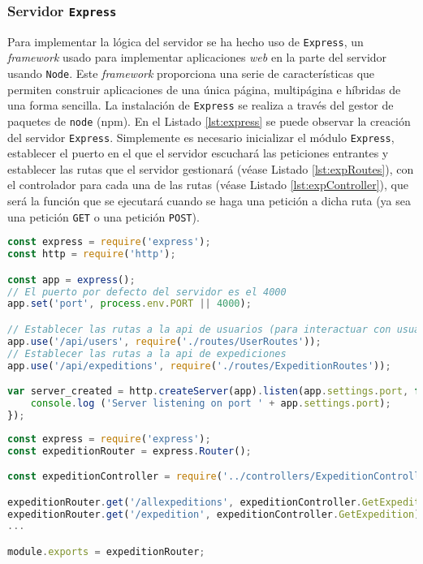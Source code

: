 \subsubsection{Servidor \texttt{Express}}

Para implementar la lógica del servidor se ha hecho uso de \texttt{Express}, un \textit{framework} usado para implementar aplicaciones \textit{web} en la parte del servidor usando \texttt{Node}. Este \textit{framework} proporciona una serie de características que permiten construir aplicaciones de una única página, multipágina e híbridas de una forma sencilla. La instalación de \texttt{Express} se realiza a través del gestor de paquetes de \texttt{node} (\ac{npm}). En el Listado \ref{lst:express} se puede observar la creación del servidor \texttt{Express}. Simplemente es necesario inicializar el módulo \texttt{Express}, establecer el puerto en el que el servidor escuchará las peticiones entrantes y establecer las rutas que el servidor gestionará (véase Listado \ref{lst:expRoutes}), con el controlador para cada una de las rutas (véase Listado \ref{lst:expController}), que será la función que se ejecutará cuando se haga una petición a dicha ruta (ya sea una petición \texttt{GET} o una petición \texttt{POST}).

\begin{lstlisting}[language=javascript,captionpos=t,caption={\textbf{Creación del servidor \texttt{Express} de la plataforma \textit{web}.}},label={lst:express}]
const express = require('express');
const http = require('http');

const app = express();
// El puerto por defecto del servidor es el 4000
app.set('port', process.env.PORT || 4000);

// Establecer las rutas a la api de usuarios (para interactuar con usuarios)
app.use('/api/users', require('./routes/UserRoutes'));
// Establecer las rutas a la api de expediciones
app.use('/api/expeditions', require('./routes/ExpeditionRoutes'));

var server_created = http.createServer(app).listen(app.settings.port, function() {
	console.log ('Server listening on port ' + app.settings.port);
});
\end{lstlisting}

\begin{lstlisting}[language=javascript,captionpos=t,caption={\textbf{Rutas que gestiona el servidor al manejar peticiones a la \ac{API} de expediciones.}},label={lst:expRoutes}]
const express = require('express');
const expeditionRouter = express.Router();

const expeditionController = require('../controllers/ExpeditionController');

expeditionRouter.get('/allexpeditions', expeditionController.GetExpeditionsFromUser);
expeditionRouter.get('/expedition', expeditionController.GetExpedition);
...

module.exports = expeditionRouter;
\end{lstlisting}

